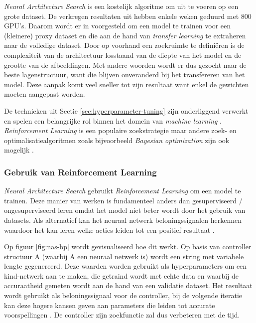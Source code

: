\textit{Neural Architecture Search} is een kostelijk algoritme om uit te voeren op een grote dataset. De verkregen resultaten uit \textcite{ZophL2016} hebben enkele weken geduurd met 800 GPU's. Daarom wordt er in \textcite{Zoph2017} voorgesteld om een model te trainen voor een (kleinere) proxy dataset en die aan de hand van \textit{transfer learning} te extraheren naar de volledige dataset. Door op voorhand een zoekruimte te definiëren is de complexiteit van de architectuur losstaand van de diepte van het model en de grootte van de afbeeldingen. Met andere woorden wordt er dus gezocht naar de beste lagenstructuur, want die blijven onveranderd bij het transfereren van het model. Deze aanpak komt veel sneller tot zijn resultaat want enkel de gewichten moeten aangepast worden.

De technieken uit Sectie \ref{sec:hyperparameter-tuning} zijn onderliggend verwerkt en spelen een belangrijke rol binnen het domein van \textit{machine learning} \autocite{ZophL2016}. \textit{Reinforcement Learning} is een populaire zoekstrategie maar andere zoek- en optimalisatiealgoritmen zoals bijvoorbeeld \textit{Bayesian optimization} zijn ook mogelijk \autocite{Elsken2019}.

\subsubsection{Gebruik van Reinforcement Learning}
\label{subsubsec:nas-reinforcement}

\textit{Neural Architecture Search} gebruikt \textit{Reinforcement Learning} om een model te trainen. Deze manier van werken is fundamenteel anders dan gesuperviseerd / ongesuperviseerd leren omdat het model niet beter wordt door het gebruik van datasets. Als alternatief kan het neuraal netwerk beloningssignalen herkennen waardoor het kan leren welke acties leiden tot een positief resultaat \autocite{Lievens2019}.

Op figuur \ref{fig:nas-bp} wordt gevisualiseerd hoe dit werkt. Op basis van controller structuur A (waarbij A een neuraal netwerk is) wordt een string met variabele lengte gegenereerd. Deze waarden worden gebruikt als hyperparameters om een kind-netwerk aan te maken, die getraind wordt met echte data en waarbij de accuraatheid gemeten wordt aan de hand van een validatie dataset. Het resultaat wordt gebruikt als beloningssignaal voor de controller, bij de volgende iteratie kan deze hogere kansen geven aan parameters die leiden tot accurate voorspellingen \autocite{ZophL2016}. De controller zijn zoekfunctie zal dus verbeteren met de tijd.

